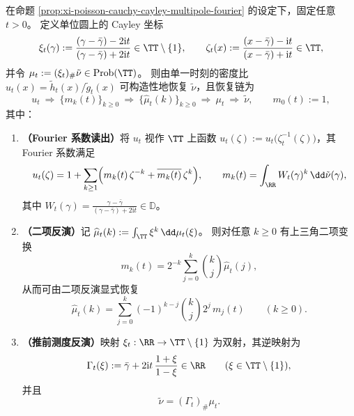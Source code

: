 \begin{theorem}\label{thm:xi-poisson-cauchy-cayley-fourier-inversion-single-time}
在命题 \ref{prop:xi-poisson-cauchy-cayley-multipole-fourier} 的设定下，固定任意 \(t>0\)。
定义单位圆上的 Cayley 坐标
\[
\xi_t(\gamma):=\frac{(\gamma-\bar\gamma)-2\mathrm{i}t}{(\gamma-\bar\gamma)+2\mathrm{i}t}\in\TT\setminus\{1\},
\qquad
\zeta_t(x):=\frac{(x-\bar\gamma)-\mathrm{i}t}{(x-\bar\gamma)+\mathrm{i}t}\in\TT,
\]
并令 \(\mu_t:=(\xi_t)_\#\tilde\nu\in\mathrm{Prob}(\TT)\)。
则由单一时刻的密度比 \(u_t(x)=\tilde h_t(x)/\tilde g_t(x)\) 可构造性地恢复 \(\tilde\nu\)，且恢复链为
\[
u_t\ \Longrightarrow\ \{m_k(t)\}_{k\ge 0}\ \Longrightarrow\ \{\widehat\mu_t(k)\}_{k\ge 0}\ \Longrightarrow\ \mu_t\ \Longrightarrow\ \tilde\nu,
\qquad m_0(t):=1,
\]
其中：
\begin{enumerate}
  \item \textbf{（Fourier 系数读出）}将 \(u_t\) 视作 \(\TT\) 上函数 \(u_t(\zeta):=u_t\bigl(\zeta_t^{-1}(\zeta)\bigr)\)，其 Fourier 系数满足
  \[
  u_t(\zeta)=1+\sum_{k\ge1}\Bigl(m_k(t)\,\zeta^{-k}+\overline{m_k(t)}\,\zeta^{k}\Bigr),
  \qquad
  m_k(t)=\int_{\RR}W_t(\gamma)^k\,\dd\tilde\nu(\gamma),
  \]
  其中 \(W_t(\gamma)=\frac{\gamma-\bar\gamma}{(\gamma-\bar\gamma)+2\mathrm{i}t}\in\mathbb D\)。
  \item \textbf{（二项反演）}记 \(\widehat\mu_t(k):=\int_{\TT}\xi^k\,\dd\mu_t(\xi)\)。
  则对任意 \(k\ge 0\) 有上三角二项变换
  \[
  m_k(t)=2^{-k}\sum_{j=0}^{k}\binom{k}{j}\widehat\mu_t(j),
  \]
  从而可由二项反演显式恢复
  \[
  \widehat\mu_t(k)=\sum_{j=0}^{k}(-1)^{k-j}\binom{k}{j}2^{j}\,m_j(t)\qquad(k\ge 0).
  \]
  \item \textbf{（推前测度反演）}映射 \(\xi_t:\RR\to\TT\setminus\{1\}\) 为双射，其逆映射为
  \[
  \Gamma_t(\xi):=\bar\gamma+2\mathrm{i}t\,\frac{1+\xi}{1-\xi}\in\RR\qquad(\xi\in\TT\setminus\{1\}),
  \]
  并且
  \[
  \tilde\nu=(\Gamma_t)_\#\mu_t.
  \]
\end{enumerate}
\end{theorem}
